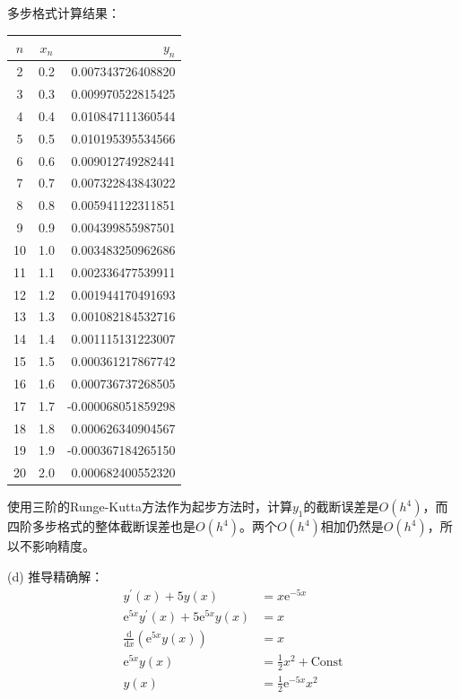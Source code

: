 \documentclass[12pt,a4paper,utf8]{ctexart}
\begin{document}
\begin{enumerate}
多步格式计算结果：

\begin{center}
    \begin{tabular}{c|c|r}
        \hline
        $n$ & $x_n$ & $y_n$ \\
        \hline
        2 & 0.2 & 0.007343726408820\\
        3 & 0.3 & 0.009970522815425\\
        4 & 0.4 & 0.010847111360544\\
        5 & 0.5 & 0.010195395534566\\
        6 & 0.6 & 0.009012749282441\\
        7 & 0.7 & 0.007322843843022\\
        8 & 0.8 & 0.005941122311851\\
        9 & 0.9 & 0.004399855987501\\
        10 & 1.0 & 0.003483250962686\\
        11 & 1.1 & 0.002336477539911\\
        12 & 1.2 & 0.001944170491693\\
        13 & 1.3 & 0.001082184532716\\
        14 & 1.4 & 0.001115131223007\\
        15 & 1.5 & 0.000361217867742\\
        16 & 1.6 & 0.000736737268505\\
        17 & 1.7 & -0.000068051859298\\
        18 & 1.8 & 0.000626340904567\\
        19 & 1.9 & -0.000367184265150\\
        20 & 2.0 & 0.000682400552320\\
        \hline
    \end{tabular}
\end{center}

使用三阶的Runge-Kutta方法作为起步方法时，计算$y_1$的截断误差是$O(h^4)$，而四阶多步格式的整体截断误差也是$O(h^4)$。两个$O(h^4)$相加仍然是$O(h^4)$，所以不影响精度。

\subitem(d)
推导精确解：
\begin{equation}
    \begin{aligned}
        y^{'}(x)+5y(x)&=x\mathrm{e}^{-5x}\\
        \mathrm{e}^{5x}y^{'}(x)+5\mathrm{e}^{5x}y(x)&=x\\
        \frac{\mathrm{d}}{\mathrm{d}x}(\mathrm{e}^{5x}y(x))&=x\\
        \mathrm{e}^{5x}y(x)&=\frac{1}{2}x^2+\text{Const}\\
        y(x)&=\frac{1}{2}\mathrm{e}^{-5x}x^2
    \end{aligned}
\end{equation}


\end{enumerate}
\end{document}
